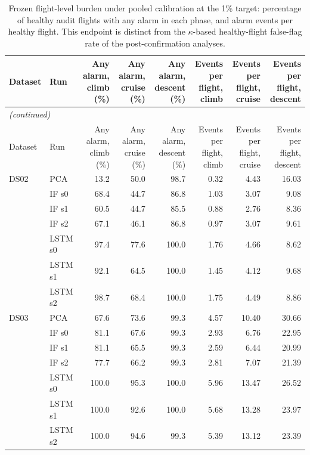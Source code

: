 \begin{scriptsize}
\begin{longtable}{llrrrrrr}
\caption{Frozen flight-level burden under pooled calibration at the 1\% target: percentage of healthy audit flights with any alarm in each phase, and alarm events per healthy flight. This endpoint is distinct from the $\kappa$-based healthy-flight false-flag rate of the post-confirmation analyses.}\label{tab:s7_burden}\\
\toprule
Dataset & Run & \makecell{Any alarm,\\climb (\%)} & \makecell{Any alarm,\\cruise (\%)} & \makecell{Any alarm,\\descent (\%)} & \makecell{Events per\\flight, climb} & \makecell{Events per\\flight, cruise} & \makecell{Events per\\flight, descent} \\
\midrule
\endfirsthead
\multicolumn{8}{l}{\emph{(continued)}}\\
\toprule
Dataset & Run & \makecell{Any alarm,\\climb (\%)} & \makecell{Any alarm,\\cruise (\%)} & \makecell{Any alarm,\\descent (\%)} & \makecell{Events per\\flight, climb} & \makecell{Events per\\flight, cruise} & \makecell{Events per\\flight, descent} \\
\midrule
\endhead
\bottomrule
\endfoot
DS02 & PCA & 13.2 & 50.0 & 98.7 & 0.32 & 4.43 & 16.03 \\
 & IF s0 & 68.4 & 44.7 & 86.8 & 1.03 & 3.07 & 9.08 \\
 & IF s1 & 60.5 & 44.7 & 85.5 & 0.88 & 2.76 & 8.36 \\
 & IF s2 & 67.1 & 46.1 & 86.8 & 0.97 & 3.07 & 9.61 \\
 & LSTM s0 & 97.4 & 77.6 & 100.0 & 1.76 & 4.66 & 8.62 \\
 & LSTM s1 & 92.1 & 64.5 & 100.0 & 1.45 & 4.12 & 9.68 \\
 & LSTM s2 & 98.7 & 68.4 & 100.0 & 1.75 & 4.49 & 8.86 \\
\midrule
DS03 & PCA & 67.6 & 73.6 & 99.3 & 4.57 & 10.40 & 30.66 \\
 & IF s0 & 81.1 & 67.6 & 99.3 & 2.93 & 6.76 & 22.95 \\
 & IF s1 & 81.1 & 65.5 & 99.3 & 2.59 & 6.44 & 20.99 \\
 & IF s2 & 77.7 & 66.2 & 99.3 & 2.81 & 7.07 & 21.39 \\
 & LSTM s0 & 100.0 & 95.3 & 100.0 & 5.96 & 13.47 & 26.52 \\
 & LSTM s1 & 100.0 & 92.6 & 100.0 & 5.68 & 13.28 & 23.97 \\
 & LSTM s2 & 100.0 & 94.6 & 99.3 & 5.39 & 13.12 & 23.39 \\
\end{longtable}
\end{scriptsize}
